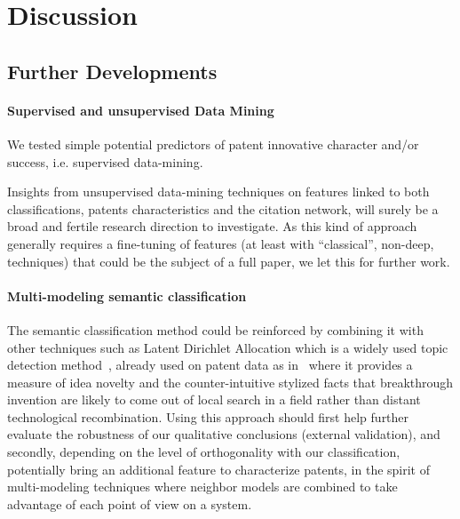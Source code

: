 \documentclass[10pt,A4]{article}
\begin{document}
\section{Discussion \label{discussion}}





\subsection{Further Developments}

\paragraph{Supervised and unsupervised Data Mining}


We tested simple potential predictors of patent innovative character and/or success, i.e. supervised data-mining. 

Insights from unsupervised data-mining techniques on features linked to both classifications, patents characteristics and the citation network, will surely be a broad and fertile research direction to investigate. As this kind of approach generally requires a fine-tuning of features (at least with ``classical'', non-deep, techniques) that could be the subject of a full paper, we let this for further work.



\paragraph{Multi-modeling semantic classification}

The semantic classification method could be reinforced by combining it with other techniques such as Latent Dirichlet Allocation which is a widely used topic detection method~\cite{blei2003latent}, already used on patent data as in~\cite{kaplan2015double} where it provides a measure of idea novelty and the counter-intuitive stylized facts that breakthrough invention are likely to come out of local search in a  field rather than distant technological recombination. Using this approach should first help further evaluate the robustness of our qualitative conclusions (external validation), and secondly, depending on the level of orthogonality with our classification, potentially bring an additional feature to characterize patents, in the spirit of multi-modeling techniques where neighbor models are combined to take advantage of each point of view on a system.
\end{document}

